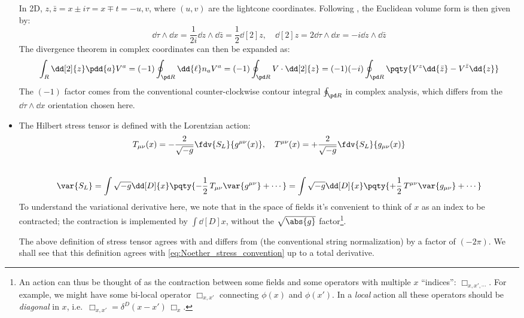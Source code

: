 \documentclass[a4paper
	,10pt
]{article}
\begin{document}
\begin{itemize}
	In 2D, $z,\bar{z} = x \pm i\tau = x \mp t = -u, v$, where $(u,v)$ are the lightcone coordinates. Following \textcite{Polchinski:1998rq}, the Euclidean volume form is then given by:
	\begin{equation}
		\dd{\tau} \wedge \dd{x}
		= \frac{1}{2i} \dd{z} \wedge \dd{\bar{z}}
		= \frac{1}{2} \dd[2]{z},
	\quad
		\dd[2]{z} = 2 \dd{\tau} \wedge \dd{x}
		= -i \dd{z} \wedge \dd{\bar{z}}
	\end{equation}
	The divergence theorem in complex coordinates can then be expanded as:
	\begin{equation}
		\int_R \dd[2]{z} \pdd{a} V^a
		= (-1) \oint_{\pd R}
			\dd{\ell} n_a V^a
		= (-1) \oint_{\pd R}
			V \cdot \dd[2]{z}
		= (-1)(-i) \oint_{\pd R} \pqty{
				V^z \dd{\bar{z}}
				- V^{\bar{z}} \dd{z}
			}
	\end{equation}
	The $(-1)$ factor comes from the conventional counter-clockwise contour integral $\oint_{\pd R}$ in complex \mbox{analysis}, which differs from the $\dd{\tau} \wedge \dd{x}$ orientation chosen here. 
	
	\item The Hilbert stress tensor is defined with the Lorentzian action:
	\begin{equation}
		T_{\mu\nu}(x)
		= - \frac{2}{\sqrt{-g}}
			\fdv{S_L}{g^{\mu\nu}(x)},
	\quad
		T^{\mu\nu}(x)
		= + \frac{2}{\sqrt{-g}}
			\fdv{S_L}{g_{\mu\nu}(x)}
	\end{equation}\\[-1.25\baselineskip]
	\begin{equation}
		\var{S_L}
		= \int \sqrt{-g} \dd[D]{x} 
			\pqty{
				-\frac{1}{2}\, T_{\mu\nu}
				\var{g^{\mu\nu}}
				+ \cdots
			}
		= \int \sqrt{-g} \dd[D]{x} 
			\pqty{
				+\frac{1}{2}\, T^{\mu\nu}
				\var{g_{\mu\nu}}
				+ \cdots
			}
	\end{equation}
	To understand the variational derivative here, we note that in the space of fields it's convenient to think of $x$ as an index to be contracted; the contraction is implemented by $
		\int \dd[D]{x}
	$, without the $\sqrt{\abs{g}}$ factor\footnote{
		An action can thus be thought of as the contraction between some fields and some operators with multiple $x$ ``indices'': $\Box_{x,x',\cdots}$. For example, we might have some bi-local operator $\Box_{x,x'}$ connecting $\phi(x)$ and $\phi(x')$. 
		In a \textit{local} action all these operators should be \textit{diagonal} in $x$, i.e.~$
			\Box_{x,x'} = \delta^D(x - x')\,\Box_x
		$. 
	}. 
	
	The above definition of stress tensor agrees with \cite{Harlow:2019yfa,Compere:2018aar} and differs from \textcite{Polchinski:1998rq} (the conventional string normalization) by a factor of $(-2\pi)$. We shall see that this definition agrees with \eqref{eq:Noether_stress_convention} up to a total derivative. 
	

\end{itemize}
\end{document}
